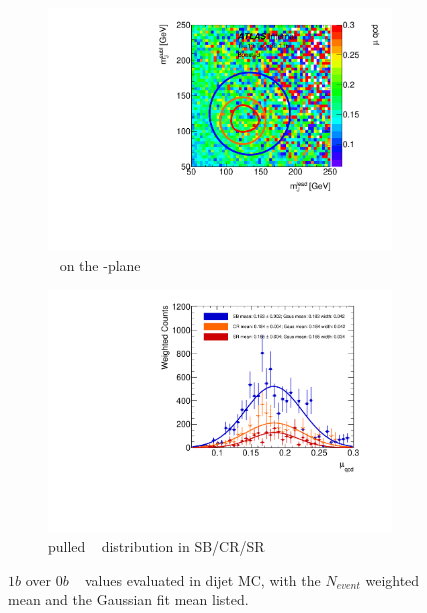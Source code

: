 \begin{figure}[htbp!]
\centering
\captionsetup{justification=centering}
	\hspace{-1cm}
    \begin{subfigure}[b]{0.4\textwidth}
        \includegraphics[width=\textwidth,angle=-90]{figures/boosted/AppendixMuqcdstudy/QCD_OneTag_Incl_mH0H1.pdf}
        \caption{\muqcd~ on the \mleadJ-\msublJ plane}
        \label{fig:app-muqcd-1b-2d-qcd}
    \end{subfigure}
    \quad \quad \quad \quad 
    \begin{subfigure}[b]{0.4\textwidth}
        \includegraphics[width=\textwidth,angle=-90]{figures/boosted/AppendixMuqcdstudy/QCD_OneTag_Incl_mH0H1_pull.pdf}
        \caption{pulled \muqcd~ distribution in SB/CR/SR}
        \label{fig:app-muqcd-1b-pull-qcd}
    \end{subfigure}
\caption{$1b$ over $0b$ \muqcd~ values evaluated in dijet MC, with the $N_{event}$ weighted mean and the Gaussian fit mean listed.}
\label{fig:app-muqcd-1b-qcd}
\end{figure}

